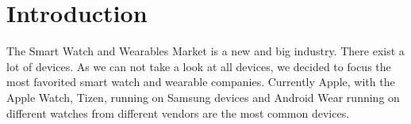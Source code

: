 \section{Introduction}

The Smart Watch and Wearables Market is a new and big industry. There exist a lot of devices.
As we can not take a look at all devices, we decided to focus the most favorited smart watch and wearable companies. 
Currently Apple, with the Apple Watch, Tizen, running on Samsung devices and Android Wear running on different watches from different vendors are the most common devices.